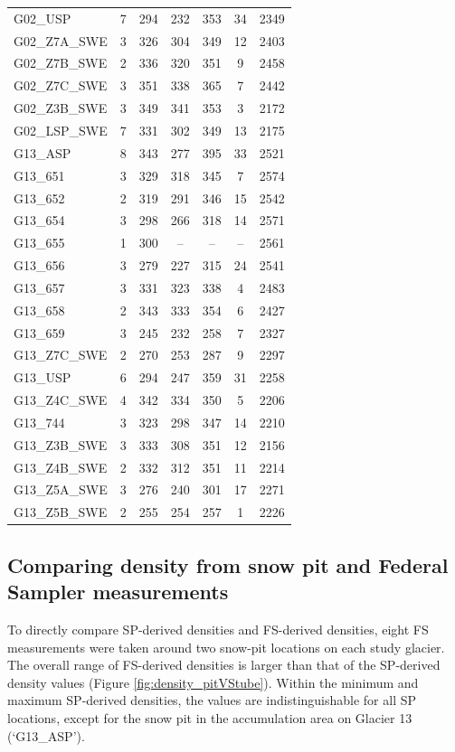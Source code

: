 \documentclass{sfuthesis}
\begin{document}
\begin{table}[]
\begin{tabular}{lcccccc}
G02\_USP & 7 & 294 & 232 & 353 & 34  & 2349\\
G02\_Z7A\_SWE & 3 & 326 & 304 & 349 & 12  & 2403\\
G02\_Z7B\_SWE & 2 & 336 & 320 & 351 & 9 & 2458 \\
G02\_Z7C\_SWE & 3 & 351 & 338 & 365 & 7 & 2442 \\
G02\_Z3B\_SWE & 3 & 349 & 341 & 353 & 3  & 2172\\
G02\_LSP\_SWE & 7 & 331 & 302 & 349 & 13 & 2175 \\ \hline
G13\_ASP & 8 & 343 & 277 & 395 & 33  & 2521\\
G13\_651 & 3 & 329 & 318 & 345 & 7  & 2574\\
G13\_652 & 2 & 319 & 291 & 346 & 15  & 2542\\
G13\_654 & 3 & 298 & 266 & 318 & 14  & 2571\\
G13\_655 & 1 & 300 &-- & -- & --  & 2561\\
G13\_656 & 3 & 279 & 227 & 315 & 24  & 2541\\
G13\_657 & 3 & 331 & 323 & 338 & 4  & 2483\\
G13\_658 & 2 & 343 & 333 & 354 & 6  & 2427\\
G13\_659 & 3 & 245 & 232 & 258 & 7 & 2327 \\
G13\_Z7C\_SWE & 2 & 270 & 253 & 287 & 9  & 2297\\
G13\_USP & 6 & 294 & 247 & 359 & 31  & 2258\\
G13\_Z4C\_SWE & 4 & 342 & 334 & 350 & 5 & 2206 \\
G13\_744 & 3 & 323 & 298 & 347 & 14 & 2210 \\
G13\_Z3B\_SWE & 3 & 333 & 308 & 351 & 12 & 2156 \\
G13\_Z4B\_SWE & 2 & 332 & 312 & 351 & 11  & 2214\\
G13\_Z5A\_SWE & 3 & 276 & 240 & 301 & 17  & 2271\\
G13\_Z5B\_SWE & 2 & 255 & 254 & 257 & 1 & 2226
\end{tabular}
\end{table}

\subsection{Comparing density from snow pit and Federal Sampler measurements}

To directly compare SP-derived densities and FS-derived densities, eight FS measurements were taken around two snow-pit locations on each study glacier.  The overall range of FS-derived densities is larger than that of the SP-derived density values (Figure \ref{fig:density_pitVStube}). Within the minimum and maximum SP-derived densities, the values are indistinguishable for all SP locations, except for the snow pit in the accumulation area on Glacier 13 (`G13\_ASP').
\end{document}
